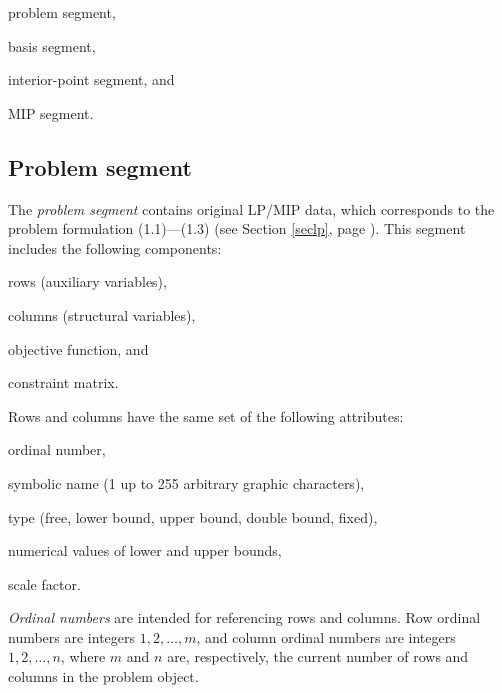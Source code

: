 
\Item{---}problem segment,

\Item{---}basis segment,

\Item{---}interior-point segment, and

\Item{---}MIP segment.

\subsection{Problem segment}

The {\it problem segment} contains original LP/MIP data, which
corresponds to the problem formulation (1.1)---(1.3) (see Section
\ref{seclp}, page \pageref{seclp}). This segment includes the following
components:


\Item{---}rows (auxiliary variables),

\Item{---}columns (structural variables),

\Item{---}objective function, and

\Item{---}constraint matrix.


Rows and columns have the same set of the following attributes:


\Item{---}ordinal number,

\Item{---}symbolic name (1 up to 255 arbitrary graphic characters),

\Item{---}type (free, lower bound, upper bound, double bound, fixed),

\Item{---}numerical values of lower and upper bounds,

\Item{---}scale factor.


{\it Ordinal numbers} are intended for referencing rows and columns.
Row ordinal numbers are integers $1, 2, \dots, m$, and column ordinal
numbers are integers $1, 2, \dots, n$, where $m$ and $n$ are,
respectively, the current number of rows and columns in the problem
object.

